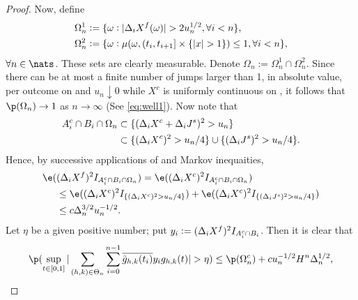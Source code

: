 \begin{proof}
\begin{comment}
\end{comment}
\begin{comment} Moreover, because $\delta >  0$,  \begin{align} \p(w_n > \delta/2) & \le \p\left(\cup_i\{I_{\{\vert x \vert > 1\}}\ast \mu( (t_i, t_{i + 1}] \times \real) > 0   , (\djt)^2 > u_n\}\right) \notag \\ & \le n \p(\mu( [0, 1/n] \times \{\vert x \vert > 1\}) > 0 ) E( (\Delta_1 J^s)^2) u_n^{-1} \notag \\ & \le c n^{-1} \kappa u_n^{-1}\notag,\end{align} which clearly tends to zero in $n$. 
\end{comment}
Now, define
\begin{align}
&\Omega_n^1 := \{\omega : \vert \Delta_i X^f(\omega) \vert > 2u^{1/2}_n, \forall  i < n\},\notag \\ 
&\Omega_n^2 := \{\omega : \mu(\omega,  (t_i, t_{i+1}] \times \{\vert x \vert > 1\} ) \le 1, \forall i <n  \},\notag 
\end{align}
$\forall n \in \nats$. These sets are clearly measurable. Denote $\Omega_n   := \Omega_n^1 \cap \Omega_n^2 $. Since there can be at most a finite number of jumps  larger than 1,  in absolute value, per outcome on \domain and  $u_n \downarrow 0$ while $X^c$ is uniformly continuous on \domain, it follows that $ \p(\Omega_n) \to 1$ as $n \to \infty$ (See \eqref{eq:well1}). Now note that 
\begin{align}
  \notag
  A_i^c \cap B_i \cap \Omega_n & \subset  \{ (\Delta_i X^c + \Delta_i J^s)^2 > u_n \} \notag\\
  &\subset \{(\Delta_i X^c)^2 > u_n/4\} \cup \{(\Delta_i J^s)^2 > u_n/4\}\notag .
  \label{}
\end{align}
Hence, by successive applications of \holder and Markov inequaities,   
\begin{align}
  \notag
 \e(&(\dxf)^2 I_{A_i^c \cap B_i \cap \Omega_n} ) = \e((\dxc)^2 I_{A_i^c \cap B_i \cap \Omega_n} )\notag \\
 &\le \e((\dxc)^2 I_{\{(\dxc)^2 > u_n/4\}}) + \e((\dxc)^2 I_{\{(\djt)^2 > u_n/4\}}) \label{} \notag\\
 & \le c \Delta_n^{3/2} u_n^{-1/2}.\notag
\end{align}
Let $\eta$ be a given positive number; put $y_i :=  (\Delta_i X^f)^2 I_{A_i^c \cap B_i}$. Then it is clear that
\begin{align}
  \p(\sup_{t \in \domain} \vert \sumt\sumin  \btghki y_i \ghk(t)\vert  > \eta) \le  \p(\Omega_n^c)  + c u^{-1/2}_nH^n\Delta_n^{1/2}, \notag
  \label{}

\end{align}
\end{proof}
